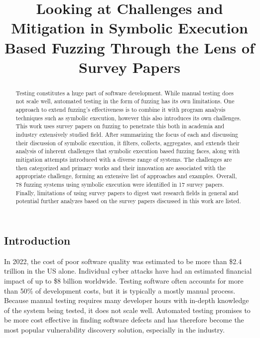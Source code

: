 \documentclass{article}
\title{Looking at Challenges and Mitigation in Symbolic Execution Based Fuzzing Through the Lens of Survey Papers}
\begin{document}


\maketitle
\begin{multicols}{2}
    \begin{abstract}
        Testing constitutes a huge part of software development. While manual testing does not scale well, automated testing in the form of fuzzing has its own limitations. One approach to extend fuzzing's effectiveness is to combine it with program analysis techniques such as symbolic execution, however this also introduces its own challenges. %
        This work uses survey papers on fuzzing to penetrate this both in academia and industry extensively studied field. After summarizing the focus of each and discussing their discussion of symbolic execution, it filters, collects, aggregates, and extends their analysis of inherent challenges that symbolic execution based fuzzing faces, along with mitigation attempts introduced with a diverse range of systems. The challenges are then categorized and primary works and their innovation are associated with the appropriate challenge, forming an extensive list of approaches and examples. Overall, 78 fuzzing systems using symbolic execution were identified in 17 survey papers. %
        Finally, limitations of using survey papers to digest vast research fields in general and potential further analyzes based on the survey papers discussed in this work are listed.
    \end{abstract}

    \section{Introduction}
    In 2022, the cost of poor software quality was estimated to be more than \$2.4 trillion in the US alone.\cite{CostPoorSoftware} Individual cyber attacks have had an estimated financial impact of up to \$8 billion worldwide.\cite{Demystifying} Testing software often accounts for more than 50\% of development costs\cite{Orchestrated}, but it is typically a mostly manual process\cite{PreliminaryAssessment}. Because manual testing requires many developer hours with in-depth knowledge of the system being tested, it does not scale well. Automated testing promises to be more cost effective in finding software defects and has therefore become the most popular vulnerability discovery solution, especially in the industry.\cite{FuzzingASurvey}


\end{multicols}
\end{document}
